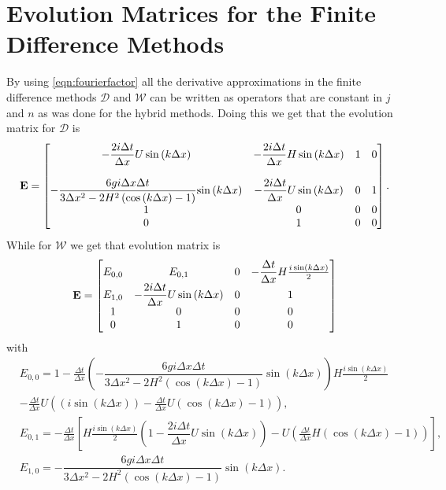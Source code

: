 \section{Evolution Matrices for the Finite Difference Methods}

By using \eqref{eqn:fourierfactor} all the derivative approximations in the finite difference methods $\mathcal{D}$ and $\mathcal{W}$ can be written as operators that are constant in $j$ and $n$ as was done for the hybrid methods. Doing this we get that the evolution matrix for $\mathcal{D}$ is 
\begin{equation*}
\mathbf{E} = \begin{bmatrix}
-  \dfrac{2 i\Delta t }{\Delta x} U\sin\left(k \Delta x\right)  & -  \dfrac{2 i\Delta t}{\Delta x} H \sin\left(k \Delta x\right)  & 1 &0 \\ \\
-\dfrac{6 gi \Delta x\Delta t}{3 \Delta x^2 -2{H^2} \left( \cos\left(k \Delta x\right) - 1 \right)}{ \sin\left(k \Delta x\right)}  & -\dfrac{2i \Delta t }{\Delta x} U \sin\left(k \Delta x\right)  & 0 &1 \\
1  & 0  &0 &0 \\
0  & 1  &0 &0 
\end{bmatrix} .
\end{equation*}
While for $\mathcal{W}$ we get that evolution matrix is 
\begin{equation}
\mathbf{E} = \begin{bmatrix}
{E}_{0,0} & {E}_{0,1} & 0 & - \dfrac{\Delta t}{\Delta x}H\frac{i\sin\left(k\Delta x\right)}{2} \\
{E}_{1,0} & -\dfrac{2i \Delta t }{\Delta x} U \sin\left(k \Delta x\right)&0 & 1 \\
1&0&0&0\\
0&1&0&0
\end{bmatrix}
\end{equation}
with
\begin{align*}
&{E}_{0,0} = 1 - \frac{\Delta t}{\Delta x}\left(-\dfrac{6 gi \Delta x\Delta t}{3 \Delta x^2 -2{H^2} \left( \cos\left(k \Delta x\right) - 1 \right)}{ \sin\left(k \Delta x\right)}\right)H\frac{i\sin\left(k\Delta x\right)}{2} \\ &- \frac{\Delta t}{\Delta x}U\left(\left(i\sin\left(k\Delta x\right)\right) - \frac{\Delta t}{\Delta x}U\left(\cos\left(k\Delta x\right) - 1\right)\right), \\
&{E}_{0,1} = - \frac{\Delta t}{\Delta x} \left[H\frac{i\sin\left(k\Delta x\right)}{2}\left( 1 -\dfrac{2i \Delta t }{\Delta x} U \sin\left(k \Delta x\right) \right)   -U\left(\frac{\Delta t}{\Delta x}H\left(\cos\left(k\Delta x\right) - 1\right)\right) \right],\\
& {E}_{1,0} =-\dfrac{6 gi \Delta x\Delta t}{3 \Delta x^2 -2{H^2} \left( \cos\left(k \Delta x\right) - 1 \right)}{ \sin\left(k \Delta x\right)}.
\end{align*}
